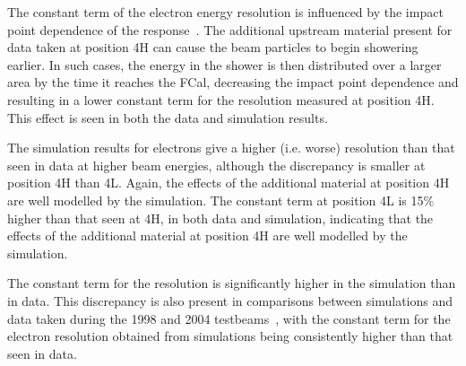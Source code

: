 %
The constant term of the electron energy resolution is influenced by the impact point dependence of the response~\cite{TB95_prototype}. The additional upstream material present for data taken at position 4H can cause the beam particles to begin showering earlier. In such cases, the energy in the shower is then distributed over a larger area by the time it reaches the FCal, decreasing the impact point dependence and resulting in a lower constant term for the resolution measured at position 4H. This effect is seen in both the data and simulation results. 

The simulation results for electrons give a higher (i.e. worse) resolution than that seen in data at higher beam energies, although the discrepancy is smaller at position 4H than 4L. Again, the effects of the additional material at position 4H are well modelled by the simulation. The constant term at position 4L is 15\% higher than that seen at 4H, in both data and simulation, indicating that the effects of the additional material at position 4H are well modelled by the simulation.

%
%


The constant term for the resolution is significantly higher in the simulation than in data. This discrepancy is also present in comparisons between \geant simulations and data taken during the 1998 and 2004 testbeams~\cite{TB98_electron_signals,TB2004pub}, with the constant term for the electron resolution obtained from simulations being consistently higher than that seen in data. 




